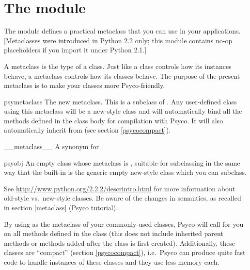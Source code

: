 \documentclass{manual}
\begin{document}
\section{The  module}\label{psycodotclasses}

The  module defines a practical metaclass that you can use in your applications.  [Metaclasses were introduced in Python 2.2 only; this module contains no-op placeholders if you import it under Python 2.1.]

A metaclass is the type of a class.  Just like a class controls how its instances behave, a metaclass controls how its classes behave.  The purpose of the present metaclass is to make your classes more Psyco-friendly.

\begin{classdesc*}{psymetaclass}
The new metaclass.  This is a subclass of . Any user-defined class using this metaclass will be a new-style class and will automatically bind all the methods defined in the class body for compilation with Psyco.  It will also automatically inherit from  (see section \ref{psycocompact}).
\end{classdesc*}

\begin{classdesc*}{__metaclass__}
A synonym for .
\end{classdesc*}

\begin{classdesc*}{psyobj}
An empty class whose metaclass is , suitable for subclassing in the same way that the built-in  is the generic empty new-style class which you can subclass.
\end{classdesc*}

See \url{http://www.python.org/2.2.2/descrintro.html} for more information about old-style vs.\ new-style classes.  Be aware of the changes in semantics, as recalled in section \ref{metaclass} (Psyco tutorial).

By using  as the metaclass of your commonly-used classes, Psyco will call  for you on all methods defined in the class (this does not include inherited parent methods or methods added after the class is first created).  Additionally, these classes are ``compact'' (section \ref{psycocompact}), i.e.\ Psyco can produce quite fast code to handle instances of these classes and they use less memory each.
\end{document}
